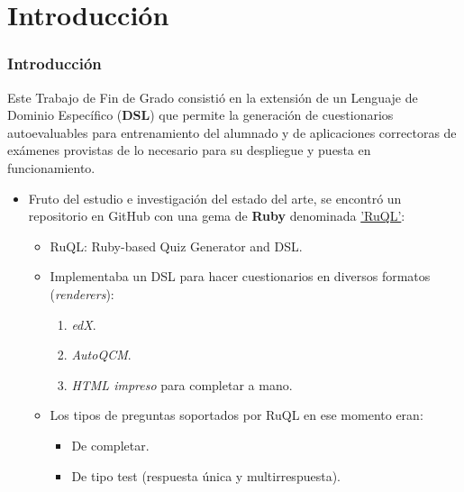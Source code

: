 \documentclass{beamer}
\begin{document}
\section{Introducción}
\begin{frame}[allowframebreaks]
  \frametitle{Introducción}
  
  \begin{center}
    Este Trabajo de Fin de Grado consistió en la extensión de un Lenguaje de Dominio Específico ({\bfseries DSL}) que permite la
    generación de cuestionarios autoevaluables para entrenamiento del alumnado y de aplicaciones correctoras de exámenes
    provistas de lo necesario para su despliegue y puesta en funcionamiento.
  \end{center}
  \framebreak
  
  \begin{itemize}
    \item Fruto del estudio e investigación del estado del arte, se encontró un repositorio en GitHub con una gema de {\bfseries Ruby} denominada 
    \href{http://github.com/saasbook/ruql}{'RuQL'}:
    \begin{itemize}
      \item RuQL: Ruby-based Quiz Generator and DSL.
      \item Implementaba un DSL para hacer cuestionarios en diversos formatos (\textit{renderers}):
      \begin{enumerate}
        \item \textit{edX}.
        \item \textit{AutoQCM}.
        \item \textit{HTML impreso} para completar a mano.
      \end{enumerate}
      \item Los tipos de preguntas soportados por RuQL en ese momento eran: 
      \begin{itemize}
        \item De completar.
        \item De tipo test (respuesta única y multirrespuesta).
      \end{itemize}
    \end{itemize}
  \end{itemize}
  \framebreak
  

\end{frame}
\end{document}
